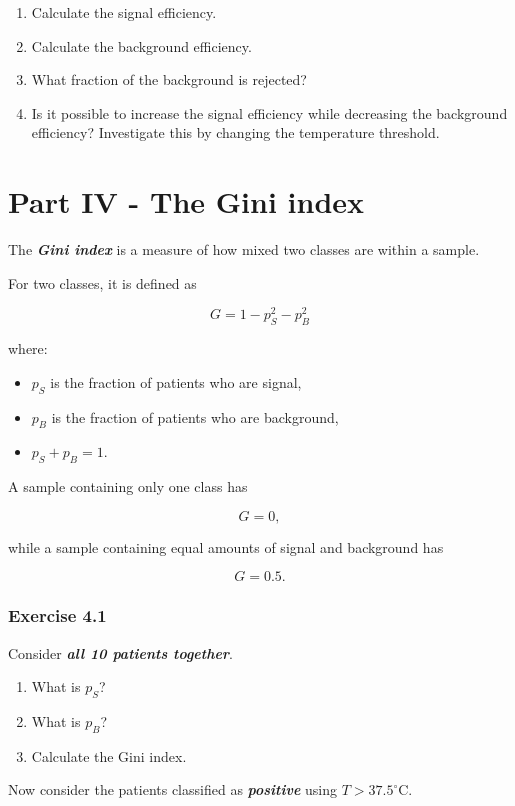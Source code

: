 \documentclass{course_sheet}
\begin{document}
\begin{enumerate}
\item
Calculate the signal efficiency.

\item
Calculate the background efficiency.

\item
What fraction of the background is rejected?

\item
Is it possible to increase the signal efficiency while decreasing the background efficiency? Investigate this by changing the temperature threshold.

\end{enumerate}
\clearpage
\section*{Part IV - The Gini index}
The \textbf{\textit{Gini index}} is a measure of how mixed two classes are within a sample.

For two classes, it is defined as

\[
{
G = 1-p_S^2-p_B^2
}
\]

where:

\begin{itemize}
\item
$p_S$ is the fraction of patients who are signal,

\item
$p_B$ is the fraction of patients who are background,

\item
$p_S+p_B=1$.

\end{itemize}
A sample containing only one class has

\[
G=0,
\]

while a sample containing equal amounts of signal and background has

\[
G=0.5.
\]

\subsubsection*{Exercise 4.1}
Consider \textbf{\textit{all 10 patients together}}.

\begin{enumerate}
\item
What is $p_S$?

\item
What is $p_B$?

\item
Calculate the Gini index.

\end{enumerate}
Now consider the patients classified as \textbf{\textit{positive}} using $T>37.5^\circ\mathrm{C}$.
\end{document}
